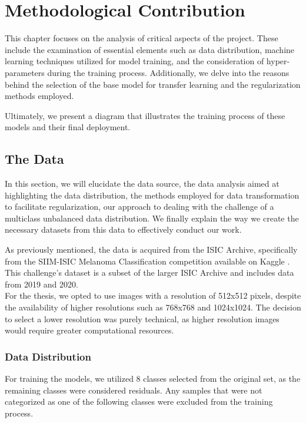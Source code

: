 \chapter{Methodological Contribution} \label{cap:contrib}


This chapter focuses on the analysis of critical aspects of the project. These
include the examination of essential elements such as data distribution,
machine learning techniques utilized for model training, and the consideration
of hyper-parameters during the training process. Additionally, we delve into
the reasons behind the selection of the base model for transfer learning and
the regularization methods employed.

Ultimately, we present a diagram that illustrates the training process of these
models and their final deployment.

\section{The Data}

In this section, we will elucidate the data source, the data analysis aimed at
highlighting the data distribution, the methods employed for data
transformation to facilitate regularization, our approach to dealing with the
challenge of a multiclass unbalanced data distribution. We finally explain the
way we create the necessary datasets from this data to effectively conduct our
work.

As previously mentioned, the data is acquired from the ISIC Archive,
specifically from the SIIM-ISIC Melanoma Classification competition available
on Kaggle \cite{ISICKaggle}. This challenge's dataset is a subset of the larger
ISIC Archive and includes data from 2019 and 2020. \\

For the thesis, we opted to use images with a resolution of 512x512 pixels,
despite the availability of higher resolutions such as 768x768 and 1024x1024.
The decision to select a lower resolution was purely technical, as higher
resolution images would require greater computational resources. \\

\subsection{Data Distribution}

For training the models, we utilized 8 classes selected from the original set,
as the remaining classes were considered residuals. Any samples that were not
categorized as one of the following classes were excluded from the training
process.


